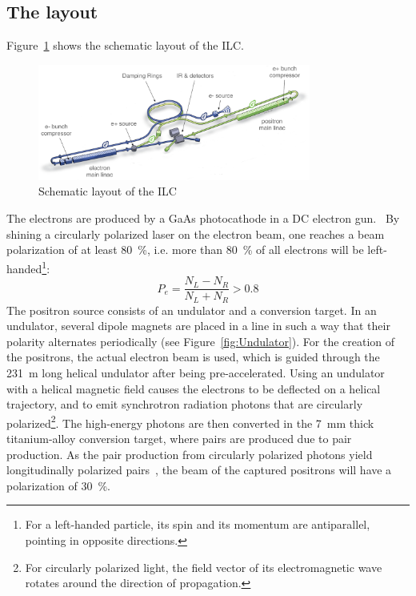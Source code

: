 \subsection{The layout}
Figure~\ref{fig:ILC_Layout} shows the schematic layout of the ILC.
\begin{figure}
\centering
\includegraphics[width=0.8\textwidth]{Figures/ILC_layout_edited.png}
\caption[Schematic layout of the ILC]{Schematic layout of the ILC~\cite[based on p. 9]{TDR1}}
\label{fig:ILC_Layout}
\end{figure}
The electrons are produced by a GaAs photocathode in a DC electron gun.~\cite[p. 13]{TDR32}
By shining a circularly polarized laser on the electron beam, one reaches a beam polarization of at least \SI{80}{\percent}, i.e. more than \SI{80}{\percent} of all electrons will be left-handed\footnote{For a left-handed particle, its spin and its momentum are antiparallel, pointing in opposite directions.}:
\begin{equation}
 P_e = \frac{N_L-N_R}{N_L+N_R} > 0.8
\end{equation}
The positron source consists of an undulator and a conversion target.
In an undulator, several dipole magnets are placed in a line in such a way that their polarity alternates periodically (see Figure~\ref{fig:Undulator}).
For the creation of the positrons, the actual electron beam is used, which is guided through the  \SI{231}{\meter} long helical undulator after being pre-accelerated.
Using an undulator with a helical magnetic field causes the electrons to be deflected on a helical trajectory, and to emit synchrotron radiation photons that are circularly polarized\footnote{For circularly polarized light, the field vector of its electromagnetic wave rotates around the direction of propagation.}.
The high-energy photons are then converted in the \SI{7}{\milli\meter} thick titanium-alloy conversion target, where \positron \electron pairs are produced due to pair production.
As the pair production from circularly polarized photons yield longitudinally polarized \positron \electron pairs~\cite{Polarization}, the beam of the captured positrons will have a polarization of \SI{30}{\percent}.~\cite[p. 14]{TDR32}
